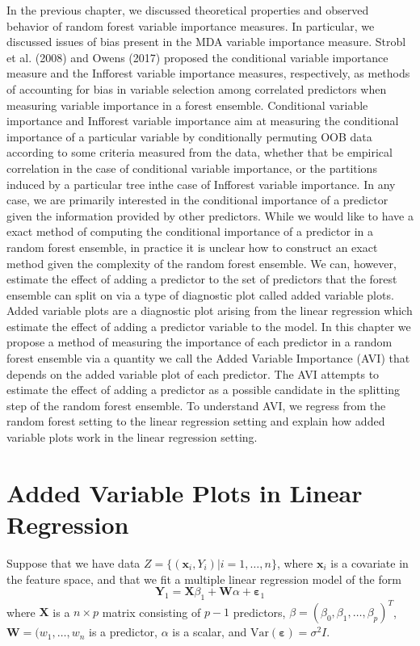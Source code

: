 \documentclass[12pt,twoside]{reedthesis}
\theoremstyle{definition}
\theoremstyle{definition}
\theoremstyle{definition}
\theoremstyle{remark}
\begin{document}
In the previous chapter, we discussed theoretical properties and
observed behavior of random forest variable importance measures. In
particular, we discussed issues of bias present in the MDA variable
importance measure. Strobl et al. (2008) and Owens (2017) proposed the
conditional variable importance measure and the Infforest variable
importance measures, respectively, as methods of accounting for bias in
variable selection among correlated predictors when measuring variable
importance in a forest ensemble. Conditional variable importance and
Infforest variable importance aim at measuring the conditional
importance of a particular variable by conditionally permuting OOB data
according to some criteria measured from the data, whether that be
empirical correlation in the case of conditional variable importance, or
the partitions induced by a particular tree inthe case of Infforest
variable importance. In any case, we are primarily interested in the
conditional importance of a predictor given the information provided by
other predictors. While we would like to have a exact method of
computing the conditional importance of a predictor in a random forest
ensemble, in practice it is unclear how to construct an exact method
given the complexity of the random forest ensemble. We can, however,
estimate the effect of adding a predictor to the set of predictors that
the forest ensemble can split on via a type of diagnostic plot called
added variable plots. Added variable plots are a diagnostic plot arising
from the linear regression which estimate the effect of adding a
predictor variable to the model. In this chapter we propose a method of
measuring the importance of each predictor in a random forest ensemble
via a quantity we call the Added Variable Importance (AVI) that depends
on the added variable plot of each predictor. The AVI attempts to
estimate the effect of adding a predictor as a possible candidate in the
splitting step of the random forest ensemble. To understand AVI, we
regress from the random forest setting to the linear regression setting
and explain how added variable plots work in the linear regression
setting.

\section{Added Variable Plots in Linear
Regression}\label{added-variable-plots-in-linear-regression}

Suppose that we have data \(Z=\{(\mathbf{x}_i,Y_i)|i=1,\ldots,n\}\),
where \(\mathbf{x}_i\) is a covariate in the feature space, and that we
fit a multiple linear regression model of the form
\[\mathbf{Y}_1=\mathbf{X}\beta_1+\mathbf{W}\alpha+\mathbf{\varepsilon}_1\]
where \(\mathbf{X}\) is a \(n\times p\) matrix consisting of \(p-1\)
predictors, \(\beta=(\beta_0,\beta_1,\ldots,\beta_p)^T\),
\(\mathbf{W}=(w_1,\ldots,w_n\) is a predictor, \(\alpha\) is a scalar,
and \(\text{Var}(\mathbf{\varepsilon})=\sigma^2 I\).
\end{document}
